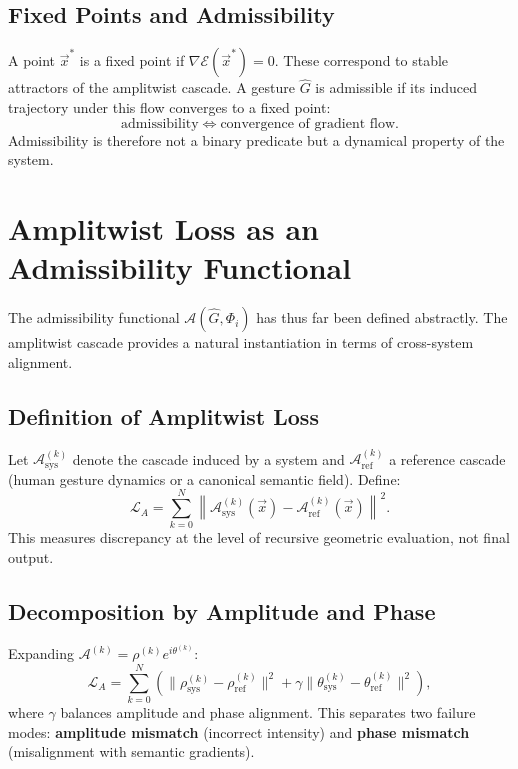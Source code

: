 \documentclass[11pt, a4paper]{article}
\begin{document}
\subsection{Fixed Points and Admissibility}

A point $\vec{x}^*$ is a fixed point if $\nabla\mathcal{E}(\vec{x}^*) = 0$.
These correspond to stable attractors of the amplitwist cascade. A
gesture $\hat{G}$ is admissible if its induced trajectory under this flow
converges to a fixed point:
\[
  \text{admissibility}
  \;\Longleftrightarrow\;
  \text{convergence of gradient flow.}
\]
Admissibility is therefore not a binary predicate but a dynamical
property of the system.

\section{Amplitwist Loss as an Admissibility Functional}

The admissibility functional $\mathcal{A}(\hat{G}, \Phi_i)$ has thus far
been defined abstractly. The amplitwist cascade provides a natural
instantiation in terms of cross-system alignment.

\subsection{Definition of Amplitwist Loss}

Let $\mathcal{A}^{(k)}_{\mathrm{sys}}$ denote the cascade induced by a
system and $\mathcal{A}^{(k)}_{\mathrm{ref}}$ a reference cascade
(human gesture dynamics or a canonical semantic field). Define:
\[
  \mathcal{L}_A =
  \sum_{k=0}^N
  \left\|
    \mathcal{A}^{(k)}_{\mathrm{sys}}(\vec{x}) -
    \mathcal{A}^{(k)}_{\mathrm{ref}}(\vec{x})
  \right\|^2.
\]
This measures discrepancy at the level of recursive geometric evaluation,
not final output.

\subsection{Decomposition by Amplitude and Phase}

Expanding $\mathcal{A}^{(k)} = \rho^{(k)}e^{i\theta^{(k)}}$:
\[
  \mathcal{L}_A =
  \sum_{k=0}^N
  \left(
    \|\rho^{(k)}_{\mathrm{sys}} - \rho^{(k)}_{\mathrm{ref}}\|^2
    + \gamma\|\theta^{(k)}_{\mathrm{sys}} - \theta^{(k)}_{\mathrm{ref}}\|^2
  \right),
\]
where $\gamma$ balances amplitude and phase alignment. This separates two
failure modes: \textbf{amplitude mismatch} (incorrect intensity) and
\textbf{phase mismatch} (misalignment with semantic gradients).
\end{document}
